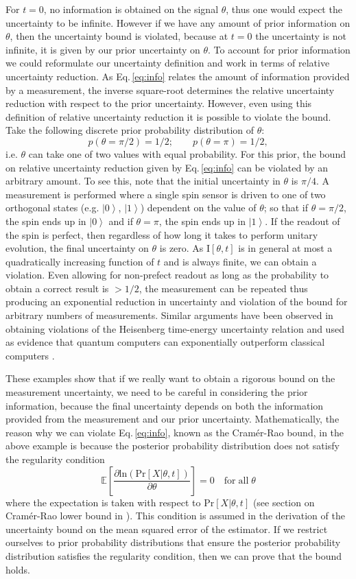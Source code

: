 \documentclass[reqno]{amsart}
\newcommand{\ket}[1]{\left| #1 \right>}
\def\8#1{\mathbb{E}\left[#1\right]}
\def\func#1#2{\mathrm{#1}\left[#2\right]}
\begin{document}
For $t = 0$, no information is obtained on the signal $\theta$, thus one would expect the uncertainty to be infinite. However if we have any amount of prior information on $\theta$, then the uncertainty bound is violated, because at $t = 0$ the uncertainty is not infinite, it is given by our prior uncertainty on $\theta$. To account for prior information we could reformulate our uncertainty definition and work in terms of relative uncertainty reduction. As Eq.\,\eqref{eq:info} relates the amount of information provided by a measurement, the inverse square-root determines the relative uncertainty reduction with respect to the prior uncertainty. However, even using this definition of relative uncertainty reduction it is possible to violate the bound. Take the following discrete prior probability distribution of $\theta$:
\[ p(\theta = \pi/2) = 1/2; \quad \quad p(\theta = \pi) = 1/2, \]
i.e. $\theta$ can take one of two values with equal probability. For this prior, the bound on relative uncertainty reduction given by Eq.\,\eqref{eq:info} can be violated by an arbitrary amount. To see this, note that the initial uncertainty in $\theta$ is $\pi/4$. A measurement is performed where a single spin sensor is driven to one of two orthogonal states (e.g. $\ket{0}$, $\ket{1}$) dependent on the value of $\theta$; so that if $\theta = \pi/2$, the spin ends up in $\ket{0}$ and if $\theta = \pi$, the spin ends up in $\ket{1}$. If the readout of the spin is perfect, then regardless of how long it takes to perform unitary evolution, the final uncertainty on $\theta$ is zero. As $\func{I}{\theta,t}$ is in general at most a quadratically increasing function of $t$ and is always finite, we can obtain a violation. Even allowing for non-prefect readout as long as the probability to obtain a correct result is $>1/2$, the measurement can be repeated thus producing an exponential reduction in uncertainty and violation of the bound for arbitrary numbers of measurements. Similar arguments have been observed in obtaining violations of the Heisenberg time-energy uncertainty relation \cite{Aharonov2002} and used as evidence that quantum computers can exponentially outperform classical computers \cite{Atia2017}.

These examples show that if we really want to obtain a rigorous bound on the measurement uncertainty, we need to be careful in considering the prior information, because the final uncertainty depends on both the information provided from the measurement and our prior uncertainty. Mathematically, the reason why we can violate Eq.\,\eqref{eq:info}, known as the Cram\'er-Rao bound, in the above example is because the posterior probability distribution does not satisfy the regularity condition 
\[ \8{\frac{\partial \mathrm{ln}\left(\func{Pr}{X|\theta,t}\right)}{\partial \theta}} = 0 \quad \mathrm{for \; all}\;\theta\]
where the expectation is taken with respect to $\func{Pr}{X|\theta,t}$ (see section on Cram\'er-Rao lower bound in \cite{Kay1993}). This condition is assumed in the derivation of the uncertainty bound on the mean squared error of the estimator. If we restrict ourselves to prior probability distributions that ensure the posterior probability distribution satisfies the regularity condition, then we can prove that the bound holds.
\end{document}
